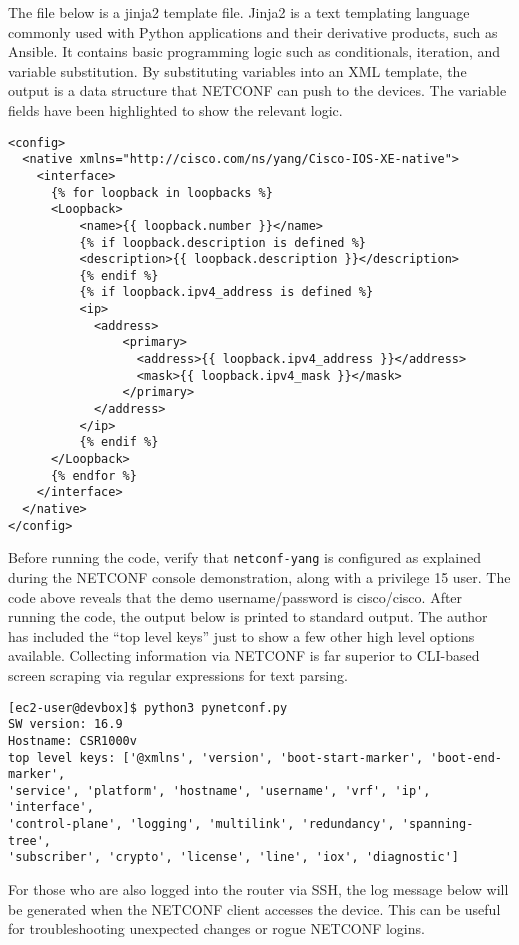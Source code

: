 The file below is a jinja2 template file. Jinja2 is a text templating language
commonly used with Python applications and their derivative products, such as
Ansible. It contains basic programming logic such as conditionals, iteration,
and variable substitution. By substituting variables into an XML template, the
output is a data structure that NETCONF can push to the devices. The variable
fields have been highlighted to show the relevant logic.

\begin{verbatim}
<config>
  <native xmlns="http://cisco.com/ns/yang/Cisco-IOS-XE-native">
    <interface>
      {% for loopback in loopbacks %}
      <Loopback>
          <name>{{ loopback.number }}</name>
          {% if loopback.description is defined %}
          <description>{{ loopback.description }}</description>
          {% endif %}
          {% if loopback.ipv4_address is defined %}
          <ip>
            <address>
                <primary>
                  <address>{{ loopback.ipv4_address }}</address>
                  <mask>{{ loopback.ipv4_mask }}</mask>
                </primary>
            </address>
          </ip>
          {% endif %}
      </Loopback>
      {% endfor %}
    </interface>
  </native>
</config>
\end{verbatim}

Before running the code, verify that \verb|netconf-yang| is configured as
explained during the NETCONF console demonstration, along with a privilege 15
user. The code above reveals that the demo username/password is cisco/cisco.
After running the code, the output below is printed to standard output. The
author has included the ``top level keys'' just to show a few other high level
options available. Collecting information via NETCONF is far superior to
CLI-based screen scraping via regular expressions for text parsing.

\begin{verbatim}
[ec2-user@devbox]$ python3 pynetconf.py 
SW version: 16.9
Hostname: CSR1000v
top level keys: ['@xmlns', 'version', 'boot-start-marker', 'boot-end-marker',
'service', 'platform', 'hostname', 'username', 'vrf', 'ip', 'interface',
'control-plane', 'logging', 'multilink', 'redundancy', 'spanning-tree',
'subscriber', 'crypto', 'license', 'line', 'iox', 'diagnostic']
\end{verbatim}

For those who are also logged into the router via SSH, the log message below
will be generated when the NETCONF client accesses the device. This can be
useful for troubleshooting unexpected changes or rogue NETCONF logins.

